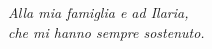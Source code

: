 \pagestyle{empty}

\begin{flushright} 
  \emph{Alla mia famiglia e ad Ilaria, \\ che mi hanno sempre sostenuto.}
\end{flushright}
